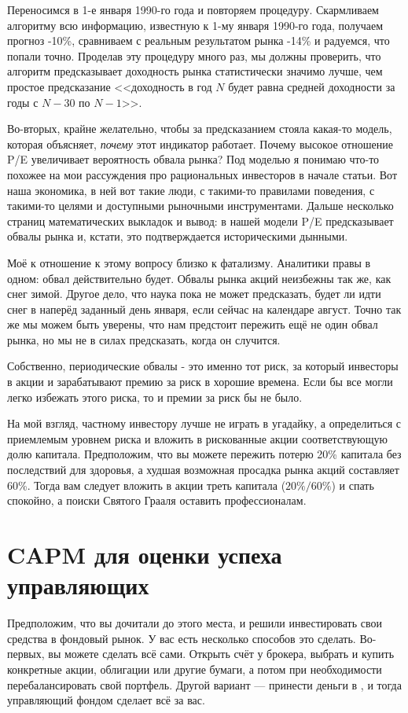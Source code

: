 Переносимся в 1-е января 1990-го года и повторяем процедуру. Скармливаем алгоритму всю информацию, известную к 1-му января 1990-го года, получаем прогноз -10\%, сравниваем с реальным результатом рынка -14\% и радуемся, что попали точно. Проделав эту процедуру много раз, мы должны проверить, что алгоритм предсказывает доходность рынка статистически значимо лучше, чем простое предсказание <<доходность в год $N$ будет равна средней доходности за годы с $N-30$ по $N-1$>>.

Во-вторых, крайне желательно, чтобы за предсказанием стояла какая-то модель, которая объясняет, \emph{почему} этот индикатор работает. Почему высокое отношение P/E увеличивает вероятность обвала рынка? Под моделью я понимаю что-то похожее на мои рассуждения про рациональных инвесторов в начале статьи. Вот наша экономика, в ней вот такие люди, с такими-то правилами поведения, с такими-то целями и доступными рыночными инструментами. Дальше несколько страниц математических выкладок и вывод: в нашей модели P/E предсказывает обвалы рынка и, кстати, это подтверждается историческими дынными.

Моё к отношение к этому вопросу близко к фатализму. Аналитики правы в одном: обвал действительно будет. Обвалы рынка акций неизбежны так же, как снег зимой. Другое дело, что наука пока не может предсказать, будет ли идти снег в наперёд заданный день января, если сейчас на календаре август. Точно так же мы можем быть уверены, что нам предстоит пережить ещё не один обвал рынка, но мы не в силах предсказать, когда он случится.

Собственно, периодические обвалы - это именно тот риск, за который инвесторы в акции и зарабатывают премию за риск в хорошие времена. Если бы все могли легко избежать этого риска, то и премии за риск бы не было.

На мой взгляд, частному инвестору лучше не играть в угадайку, а определиться с приемлемым уровнем риска и вложить в рискованные акции соответствующую долю капитала. Предположим, что вы можете пережить потерю 20\% капитала без последствий для здоровья, а худшая возможная просадка рынка акций составляет 60\%. Тогда вам следует вложить в акции треть капитала ($20\%/60\%$) и спать спокойно, а поиски Святого Грааля оставить профессионалам.

\section{CAPM для оценки успеха управляющих}

Предположим, что вы дочитали до этого места, и решили инвестировать свои средства в фондовый рынок. У вас есть несколько способов это сделать. Во-первых, вы можете сделать всё сами. Открыть счёт у брокера, выбрать и купить конкретные акции, облигации или другие бумаги, а потом при необходимости перебалансировать свой портфель. Другой вариант --- принести деньги в , и тогда управляющий фондом сделает всё за вас.

